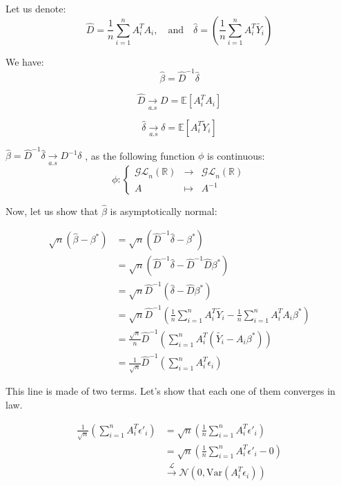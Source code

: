 Let us denote:
\[
\hat{D}  = \frac{1}{n} \sum_{i=1}^{n}   A_i ^T A_i , \quad \text{and} \quad \hat{\delta}  = \left( \frac{1}{n} \sum_{i=1}^{n} A_i ^T \tilde{Y_i } \right)
\]

We have:
\[
\hat{\beta} = \hat{D} ^{-1} \hat{\delta}
\]

\[
\hat{D}  \underset{a.s}{\rightarrow} D=  \mathbb{E}[A_i ^T A_i ]
\]

\[
\hat{\delta}   \underset{a.s}{\rightarrow}  \delta = \mathbb{E}[A_i ^T \tilde{Y}_i ]
\]

$ \hat{\beta} = \hat{D}^{-1} \hat{\delta}  \underset{a.s}{\rightarrow}  D^{-1} \delta $ , as the following function $\phi$ is continuous:
\[
\phi: \left\{
\begin{array}{rcl}
\mathcal{GL}_n(\mathbb{R}) & \to & \mathcal{GL}_n(\mathbb{R}) \\
A & \mapsto & A^{-1}
\end{array}
\right.
\]


Now, let us show that $\hat{\beta}$ is asymptotically normal: 

\begin{align*}
    \sqrt{n} ( \hat{\beta} - \beta ^* ) &= \sqrt{n} (\hat{D}^{-1} \hat{\delta} - \beta ^* ) \\
     &= \sqrt{n} (\hat{D}^{-1} \hat{\delta} - \hat{D}^{-1} \hat{D} \beta ^* ) \\
     &= \sqrt{n} \hat{D}^{-1} (\hat{\delta} -  \hat{D} \beta ^* )  \\
     &= \sqrt{n} \hat{D}^{-1} \left( \frac{1}{n} \sum_{i=1}^{n} A_i ^T \tilde{Y_i} - \frac{1}{n}  \sum_{i=1}^{n}  A_i ^T A_i \beta ^* \right)  \\
     &= \frac{\sqrt{n}}{n} \hat{D}^{-1} \left( \sum_{i=1}^{n} A_i ^T (\tilde{Y_i} -    A_i \beta ^* ) \right)   \\
     &= \frac{1}{\sqrt{n}}  \hat{D} ^{-1} \left( \sum_{i=1}^{n}  A_i ^T \epsilon _ i \right)  
\end{align*}

This line is made of two terms. Let's show that each one of them converges in law. 

\begin{align*}
    \frac{1}{\sqrt{n}} \left( \sum_{i=1}^{n}  A_i^T \epsilon'_i \right) &= \sqrt{n} \left( \frac{1}{n} \sum_{i=1}^{n}  A_i^T \epsilon'_i \right) \\
    &= \sqrt{n} \left( \frac{1}{n} \sum_{i=1}^{n}  A_i^T \epsilon'_i - 0 \right) \\
    &\xrightarrow{\mathcal{L}} \mathcal{N}(0, \text{Var}(A_i^T \epsilon_i) )
\end{align*}

